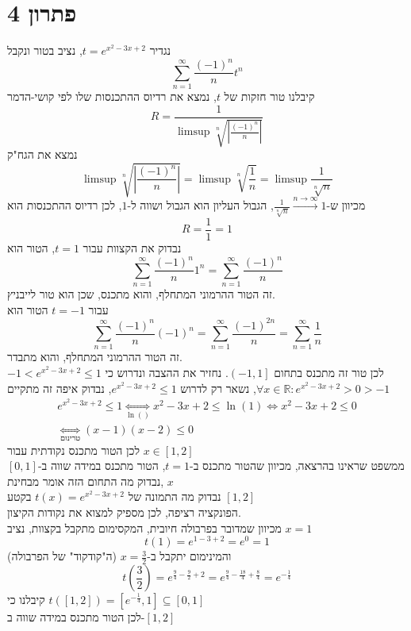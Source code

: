 \documentclass[12pt, titlepage]{article}
\begin{document}
\part*{פתרון 4}
נגדיר $t = e^{x^2-3x+2}$, נציב בטור ונקבל
\[
    \sum_{n=1}^\infty \frac{\left(-1\right)^n}{n}t^n
\]
קיבלנו טור חזקות של $t$, נמצא את רדיוס ההתכנסות שלו לפי קושי-הדמר
\[
    R = \frac{1}{\limsup \sqrt[n]{\left|\frac{\left(-1\right)^n}{n}\right|}}
\]
נמצא את הגח"ק
\[
    \limsup \sqrt[n]{\left|\frac{\left(-1\right)^n}{n}\right|} = \limsup \sqrt[n]{\frac{1}{n}} = \limsup \frac{1}{\sqrt[n]{n}}
\]
מכיוון ש-$\frac{1}{\sqrt[n]{n}} \xrightarrow{n\to\infty}1$, הגבול העליון הוא הגבול ושווה ל-$1$, לכן רדיוס ההתכנסות הוא 
\[
    R = \frac{1}{1} = 1
\]
נבדוק את הקצוות
עבור $t=1$, הטור הוא
\[
    \sum_{n=1}^\infty \frac{\left(-1\right)^n}{n} 1^n = \sum_{n=1}^\infty \frac{\left(-1\right)^n}{n}
\]
זה הטור ההרמוני המתחלף, והוא מתכנס, שכן הוא טור לייבניץ.\\
עבור $t=-1$ הטור הוא
\[
    \sum_{n=1}^\infty \frac{\left(-1\right)^n}{n} \left(-1\right)^{n} = \sum_{n=1}^\infty \frac{\left(-1\right)^{2n}}{n} = \sum_{n=1}^\infty \frac{1}{n}
\]
זה הטור ההרמוני המתחלף, והוא מתבדר.\\
לכן טור זה מתכנס בתחום $\left(-1,1\right]$.
נחזיר את ההצבה ונדרוש כי $-1<e^{x^2-3x+2} \leq 1$
$\forall x \in \mathbb{R}: e^{x^2-3x+2} > 0 > -1$, נשאר רק לדרוש $e^{x^2-3x+2} \leq 1$, נבדוק איפה זה מתקיים
\begin{gather*}
    e^{x^2-3x+2} \leq 1 \underset{\ln()}{\iff} x^2-3x+2 \leq \ln\left(1\right) \iff x^2-3x+2 \leq 0\\
    \underset{\text{טרינום}}{\iff} \left(x-1\right) \left(x-2\right) \leq 0
\end{gather*}
לכן הטור מתכנס נקודתית עבור $x\in\left[1,2\right]$\\
ממשפט שראינו בהרצאה, מכיוון שהטור מתכנס ב-$t=1$, הטור מתכנס במידה שווה ב-$\left[0,1\right]$,נבדוק מה התחום הזה אומר מבחינת $x$\\
נבדוק מה התמונה של $t(x) = e^{x^2 -3x + 2}$ בקטע $\left[1,2\right]$\\
הפונקציה רציפה, לכן מספיק למצוא את נקודות הקיצון.\\
מכיוון שמדובר בפרבולה חיובית, המקסימום מתקבל בקצוות, נציב $x=1$
\[
    t(1) = e^{1 -3  +2} = e^0 = 1
\]
והמינימום יתקבל ב-$x=\frac{3}{2}$ (ה"קודקוד" של הפרבולה)
\[
    t\left(\frac{3}{2}\right) = e^{\frac{9}{4} - \frac{9}{2} + 2 }=e^{\frac{9}{4} - \frac{18}{4}  +\frac{8}{4} }=e^{ -\frac{1}{4}} 
\]
קיבלנו כי
$t\left(\left[1,2\right]\right) = \left[e^{-\frac{1}{4}},1\right] \subseteq \left[0,1\right]$\\
לכן הטור מתכנס במידה שווה ב-$\left[1,2\right]$
\newpage
\end{document}
